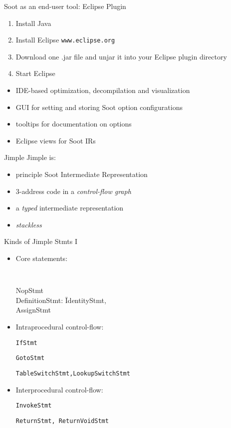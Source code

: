 \begin{slide}{Soot as an end-user tool:  Eclipse Plugin}
\vspace{-0.1in}
\begin{small}
\begin{enumerate}
\item Install Java
\item Install Eclipse {\tt www.eclipse.org}
\item Download one .jar file and unjar it into your Eclipse plugin directory 
\item Start Eclipse 
\end{enumerate}

\begin{itemize}
\item IDE-based optimization, decompilation and visualization
\item GUI for setting and storing Soot option configurations
\item tooltips for documentation on options
\item Eclipse views for Soot IRs
\end{itemize}
\end{small}
\end{slide}

\begin{slide}{Jimple}
Jimple is:
\begin{itemize}
\item principle Soot Intermediate Representation
\item 3-address code in a \emph{control-flow graph}
\item a \emph{typed} intermediate representation
\item \emph{stackless}
\end{itemize}
\end{slide}

\begin{slide}{Kinds of Jimple Stmts I}
\vspace*{-0.1in}
\begin{itemize}
\item Core statements:
\vspace*{-0.1in}
{\tt 
\begin{tabbing}
\quad NopStmt \\
\quad DefinitionStmt: \= IdentityStmt, \\
                \>AssignStmt 
\end{tabbing}}

\vspace*{-0.1in}
\item Intraprocedural control-flow:

{\tt \quad IfStmt}

{\tt \quad GotoStmt}

{\tt \quad TableSwitchStmt,LookupSwitchStmt}

\item Interprocedural control-flow:

{\tt \quad InvokeStmt}

{\tt \quad ReturnStmt, ReturnVoidStmt}

\end{itemize}
\end{slide}

